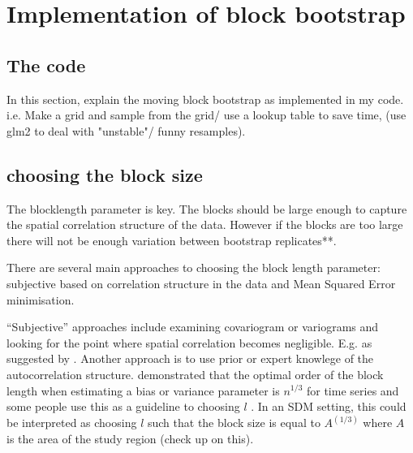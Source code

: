 \documentclass[a4paper,12pt]{article}
\begin{document}

\section{Implementation of block bootstrap} 
\subsection{The code}
In this section, explain the moving block bootstrap as implemented in my code. i.e. Make a grid and sample from the grid/ use a lookup table to save time, (use glm2 to deal with "unstable"/ funny resamples). 
\subsection{choosing the block size}

The blocklength parameter is key. The blocks should be large enough to capture the spatial correlation structure of the data. However if the blocks are too large there will not be enough variation between bootstrap replicates**. 

There are several main approaches to choosing the block length parameter: subjective based on correlation structure in the data and Mean Squared Error minimisation. 

``Subjective'' approaches include examining covariogram or variograms and looking for the point where spatial correlation becomes negligible. E.g. as suggested by \cite{kunsch1989jackknife}. Another approach is to use prior or expert knowlege of the autocorrelation structure. \cite{HALL01091995} demonstrated that the optimal order of the block length when estimating a bias or variance parameter is $n^{1/3}$ for time series and some people use this as a guideline to choosing $l$ \citep[e.g.][ in combination with expert/ prior knowledge of the autoregression structure]{Selle2010919}. In an SDM setting, this could be interpreted as choosing $l$ such that the block size is equal to $A^(1/3)$ where $A$ is the area of the study region (check up on this). 
\end{document}
